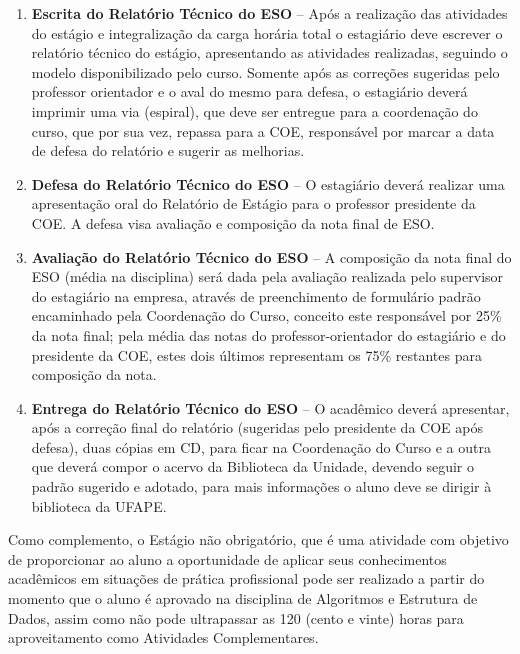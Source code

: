 \documentclass[
	12pt,				%
	openright,			%
  oneside,     %
	a4paper,			%
	chapter=TITLE,		%
	english,			%
	french,				%
	spanish,			%
	brazil				%
	]{abntex2}
\begin{document}
\begin{enumerate}
    \item \textbf{Escrita do Relatório Técnico do ESO} – Após a realização das atividades do estágio e integralização da carga horária total o estagiário deve escrever o relatório técnico do estágio, apresentando as atividades realizadas, seguindo o modelo disponibilizado pelo curso. Somente após as correções sugeridas pelo professor orientador e o aval do mesmo para defesa, o estagiário deverá imprimir uma via (espiral), que deve ser entregue para a coordenação do curso, que por sua vez, repassa para a COE, responsável por marcar a data de defesa do relatório e sugerir as melhorias.
    \item \textbf{Defesa do Relatório Técnico do ESO} – O estagiário deverá realizar uma apresentação oral do Relatório de Estágio para o professor presidente da COE. A defesa visa avaliação e composição da nota final de ESO.
    \item \textbf{Avaliação do Relatório Técnico do ESO} – A composição da nota final do ESO (média na disciplina) será dada pela avaliação realizada pelo supervisor do estagiário na empresa, através de preenchimento de formulário padrão encaminhado pela Coordenação do Curso, conceito este responsável por 25\% da nota final; pela média das notas do professor-orientador do estagiário e do presidente da COE, estes dois últimos representam os 75\% restantes para composição da nota.
    \item \textbf{Entrega do Relatório Técnico do ESO} – O acadêmico deverá apresentar, após a correção final do relatório (sugeridas pelo presidente da COE após defesa), duas cópias em CD, para ficar na Coordenação do Curso e a outra que deverá compor o acervo da Biblioteca da Unidade, devendo seguir o padrão sugerido e adotado, para mais informações o aluno deve se dirigir à biblioteca da UFAPE.
\end{enumerate}

Como complemento, o Estágio não obrigatório, que é uma atividade com objetivo de proporcionar ao aluno a oportunidade de aplicar seus conhecimentos acadêmicos em situações de prática profissional pode ser realizado a partir do momento que o aluno é aprovado na disciplina de Algoritmos e Estrutura de Dados, assim como não pode ultrapassar as 120 (cento e vinte) horas para aproveitamento como Atividades Complementares.




%
%
\end{document}
